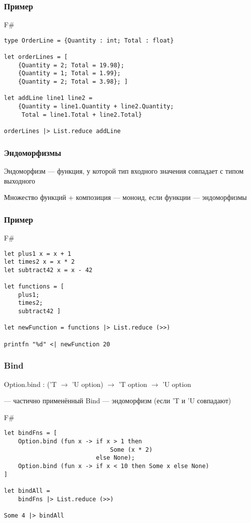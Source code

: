 \documentclass[xetex,mathserif,serif]{beamer}
\begin{document}
	\begin{frame}[fragile]
		\frametitle{Пример}
		\begin{exampleblock}{F\#}
			\begin{verbatim}
type OrderLine = {Quantity : int; Total : float}

let orderLines = [
    {Quantity = 2; Total = 19.98};
    {Quantity = 1; Total = 1.99};
    {Quantity = 2; Total = 3.98}; ]
    
let addLine line1 line2 =
    {Quantity = line1.Quantity + line2.Quantity; 
     Total = line1.Total + line2.Total}
     
orderLines |> List.reduce addLine
			\end{verbatim}
		\end{exampleblock}
\end{frame}

	\begin{frame}
		\frametitle{Эндоморфизмы}
		Эндоморфизм --- функция, у которой тип входного значения совпадает с типом выходного
		
		\vspace{1cm}
		Множество функций + композиция --- моноид, если функции --- эндоморфизмы
	\end{frame}

	\begin{frame}[fragile]
		\frametitle{Пример}
		\begin{exampleblock}{F\#}
			\begin{verbatim}
let plus1 x = x + 1
let times2 x = x * 2
let subtract42 x = x - 42

let functions = [
    plus1;
    times2;
    subtract42 ]

let newFunction = functions |> List.reduce (>>)

printfn "%d" <| newFunction 20
			\end{verbatim}
		\end{exampleblock}
\end{frame}

	\begin{frame}[fragile]
		\frametitle{Bind}
		Option.bind : ('T $\to$ 'U option) $\to$ 'T option $\to$ 'U option

		--- частично применённый Bind --- эндоморфизм (если 'T и 'U совпадают)
		\begin{exampleblock}{F\#}
			\begin{verbatim}
let bindFns = [
    Option.bind (fun x -> if x > 1 then 
                              Some (x * 2) 
                          else None);
    Option.bind (fun x -> if x < 10 then Some x else None)
]

let bindAll = 
    bindFns |> List.reduce (>>)

Some 4 |> bindAll
			\end{verbatim}
		\end{exampleblock}
\end{frame}
\end{document}
